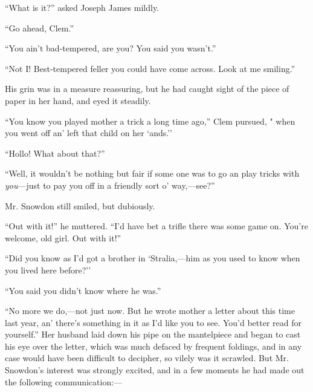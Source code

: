 {\protect\hypertarget{67}{}{}}``What is it?'' asked Joseph James mildly.

``Go ahead, Clem.''

``You ain't bad-tempered, are you? You said you wasn't.''

``Not I! Best-tempered feller you could have come across. Look at me
smiling.''

His grin was in a measure reassuring, but he had caught sight of the
piece of paper in her hand, and eyed it steadily.

``You know you played mother a trick a long time ago,'' Clem pursued, "
when you went off an' left that child on her `ands.''

``Hollo! What about that?''

``Well, it wouldn't be nothing but fair if some one was to go an play
tricks with \emph{you}---just to pay you off in a friendly sort o'
way,---see?''

Mr. Snowdon still smiled, but dubiously.

``Out with it!'' he muttered. ``I'd have bet a trifle there was some
game on. You're welcome, old girl. Out with it!''

``Did you know as I'd got a brother in `Stralia,---him as you used to
know when you lived here before?''

{\protect\hypertarget{68}{}{}}``You said you didn't know where he was.''

``No more we do,---not just now. But he wrote mother a letter about this
time last year, an' there's something in it as I'd like you to see.
You'd better read for yourself.'' Her husband laid down his pipe on the
mantelpiece and began to cast his eye over the letter, which was much
defaced by frequent foldings, and in any case would have been difficult
to decipher, so vilely was it scrawled. But Mr. Snowdon's interest was
strongly excited, and in a few moments he had made out the following
communication:---

